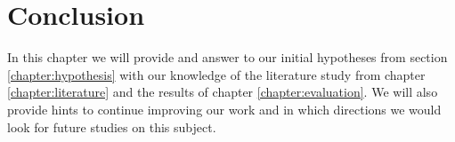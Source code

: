 \chapter{Conclusion}
In this chapter we will provide and answer to our initial hypotheses from section \ref{chapter:hypothesis} with our knowledge of the literature study from chapter \ref{chapter:literature} and the results of chapter \ref{chapter:evaluation}. We will also provide hints to continue improving our work and in which directions we would look for future studies on this subject.


